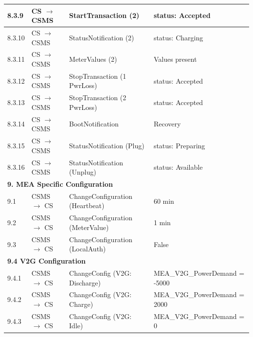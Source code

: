 \documentclass[a4paper,11pt]{report}
\begin{document}
\begin{footnotesize}
\begin{longtable}{|p{1.2cm}|p{2.5cm}|p{5.5cm}|p{6cm}|}
\hline
8.3.9 & CS $\to$ CSMS & StartTransaction (2) & status: Accepted \\
\hline
8.3.10 & CS $\to$ CSMS & StatusNotification (2) & status: Charging \\
\hline
8.3.11 & CS $\to$ CSMS & MeterValues (2) & Values present \\
\hline
8.3.12 & CS $\to$ CSMS & StopTransaction (1 PwrLoss) & status: Accepted \\
\hline
8.3.13 & CS $\to$ CSMS & StopTransaction (2 PwrLoss) & status: Accepted \\
\hline
8.3.14 & CS $\to$ CSMS & BootNotification & Recovery \\
\hline
8.3.15 & CS $\to$ CSMS & StatusNotification (Plug) & status: Preparing \\
\hline
8.3.16 & CS $\to$ CSMS & StatusNotification (Unplug) & status: Available \\
\hline

\multicolumn{4}{|l|}{\textbf{9. MEA Specific Configuration}} \\
\hline
9.1 & CSMS $\to$ CS & ChangeConfiguration (Heartbeat) & 60 min \\
\hline
9.2 & CSMS $\to$ CS & ChangeConfiguration (MeterValue) & 1 min \\
\hline
9.3 & CSMS $\to$ CS & ChangeConfiguration (LocalAuth) & False \\
\hline
\multicolumn{4}{|l|}{\textbf{9.4 V2G Configuration}} \\
\hline
9.4.1 & CSMS $\to$ CS & ChangeConfig (V2G: Discharge) & MEA\_V2G\_PowerDemand = -5000 \\
\hline
9.4.2 & CSMS $\to$ CS & ChangeConfig (V2G: Charge) & MEA\_V2G\_PowerDemand = 2000 \\
\hline
9.4.3 & CSMS $\to$ CS & ChangeConfig (V2G: Idle) & MEA\_V2G\_PowerDemand = 0 \\
\hline


\end{longtable}
\end{footnotesize}
\end{document}
